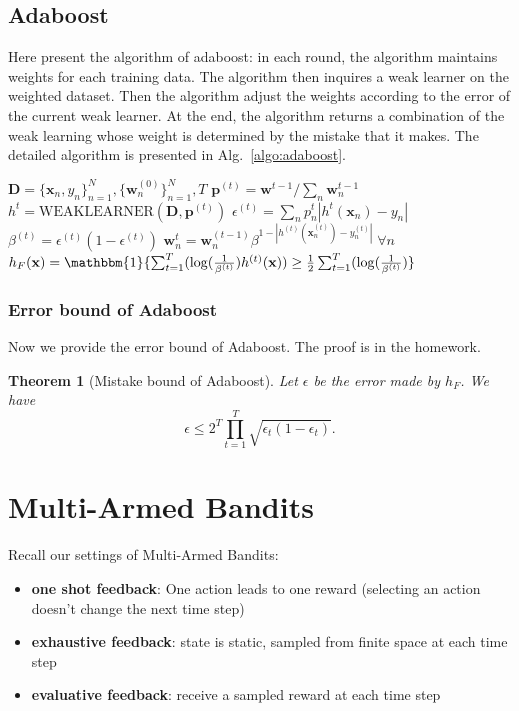 \documentclass[11pt]{article}
\newtheorem{theorem}{Theorem}
\begin{document}
\subsection{Adaboost}
Here present the algorithm of adaboost: in each round, the algorithm maintains weights for each training data. The algorithm then inquires a weak learner on the weighted dataset. Then the algorithm adjust the weights according to the error of the current weak learner. At the end, the algorithm returns a combination of the weak learning whose weight is determined by the mistake that it makes. The detailed algorithm is presented in Alg.~\ref{algo:adaboost}.
\begin{algorithm}[H]
\caption{Adaboost}
\label{algo:adaboost}
\begin{algorithmic}[1]
\REQUIRE $\textbf{D} = \{\textbf{x}_n, y_n\}_{n=1}^N, \{\textbf{w}_n^{(0)}\}_{n=1}^N, T$
\STATE $\textbf{p}^{(t)} = \textbf{w}^{t-1} / \sum_{n} \textbf{w}_n^{t-1}$
\STATE $h^{t} = \text{WEAKLEARNER}(\textbf{D}, \textbf{p}^{(t)})$
\STATE $\epsilon^{(t)} = \sum_{n} p^{t}_n |h^{t}(\textbf{x}_n) - y_n|$
\STATE $\beta^{(t)} = \epsilon^{(t)}(1-\epsilon^{(t)})$
\STATE $\textbf{w}^{t}_n = \textbf{w}^{(t-1)}_n \beta^{1-|h^{(t)}(\textbf{x}^{(t)}_n)-y^{(t)}_n|} \; \forall n$
\ENDFOR
\STATE $h_F(\textbf{x}) = \mathbbm{1}\{ \sum_{t=1}^T (\log(\frac{1}{\beta^{(t)}}) h^{(t)}(\textbf{x})) \geq \frac{1}{2} \sum_{t=1}^T (\log(\frac{1}{\beta^{(t)}}) \}$
\end{algorithmic}
\end{algorithm}

\subsubsection{Error bound of Adaboost}
Now we provide the error bound of Adaboost. The proof is in the homework.
\begin{theorem}[Mistake bound of Adaboost]
Let $\epsilon$ be the error made by $h_F$. We have
\[\epsilon \leq 2^T \prod_{t=1}^T \sqrt{\epsilon_t(1-\epsilon_t)}.\]
\label{theorm:adaboost}
\end{theorem}

\section{Multi-Armed Bandits}
Recall our settings of Multi-Armed Bandits:
\begin{itemize}
    \item \textbf{one shot feedback}: One action leads to one reward (selecting an action doesn’t change the next time step)
    \item \textbf{exhaustive feedback}: state is static, sampled from finite space at each time step
    \item \textbf{evaluative feedback}: receive a sampled reward at each time step
\end{itemize}
\end{document}
